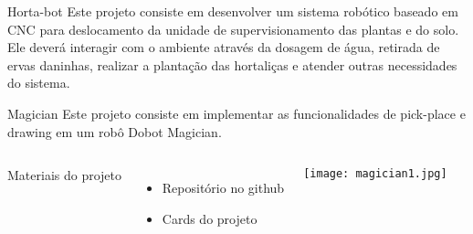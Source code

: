\begin{frame}[t]{Horta-bot} 
    Este projeto consiste em desenvolver um sistema robótico baseado em CNC para deslocamento da unidade de supervisionamento das plantas e do solo. Ele deverá interagir com o ambiente através da dosagem de água, retirada de ervas daninhas, realizar a plantação das hortaliças e atender outras necessidades do sistema.


\end{frame}
\begin{frame}[c]{} 
   
    \begin{center}
    \end{center}
       
\end{frame}
%
\begin{frame}[t]{Magician} 
    Este projeto consiste em implementar as funcionalidades de pick-place e drawing em um robô Dobot Magician.
    \vspace*{0.3cm}



        \begin{columns}[c]
            Materiais do projeto
            \vspace*{0.3cm}
                \begin{itemize}
                    \item Repositório no github
                    \item Cards do projeto
                \end{itemize}
                \texttt{[image: magician1.jpg]}
        \end{columns}

\end{frame}
